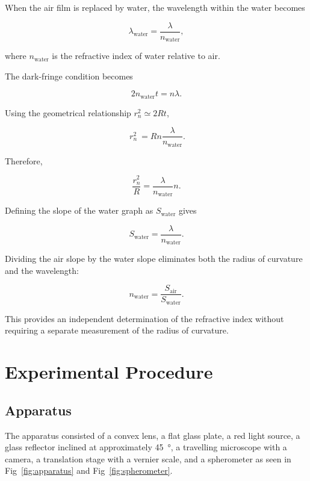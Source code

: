 \documentclass[12pt,a4paper]{article}
\begin{document}
When the air film is replaced by water, the
wavelength within the water becomes

\[
\lambda_{\mathrm{water}}
=\frac{\lambda}{n_{\mathrm{water}}},
\]

where $n_{\mathrm{water}}$ is the refractive index
of water relative to air.

The dark-fringe condition becomes

\[
2n_{\mathrm{water}}t=n\lambda.
\]

Using the geometrical relationship
$r_n^2\simeq 2Rt$,

\[
\ r_n^2
\ =Rn\frac{\lambda}{n_{\mathrm{water}}}.
\]

Therefore,

\begin{equation}
\boxed{
\frac{r_n^2}{R}
=\frac{\lambda}{n_{\mathrm{water}}}n
}.
\label{eq:water_slope}
\end{equation}

Defining the slope of the water graph as
$S_{\mathrm{water}}$ gives

\[
S_{\mathrm{water}}
=\frac{\lambda}{n_{\mathrm{water}}}.
\]

Dividing the air slope by the water slope
eliminates both the radius of curvature and
the wavelength:

\begin{equation}
\boxed{
n_{\mathrm{water}}  
=\frac{S_{\mathrm{air}}}{S_{\mathrm{water}}}
}.
\label{eq:ref_index}
\end{equation}

This provides an independent determination
of the refractive index without requiring
a separate measurement of the radius of
curvature.

\newpage

\section{Experimental Procedure}

\subsection{Apparatus}

The apparatus consisted of a convex lens, a
flat glass plate, a red light source, a glass
reflector inclined at approximately
\SI{45}{\degree}, a travelling microscope
with a camera, a translation stage with a
vernier scale, and a spherometer as seen in Fig~\ref{fig:apparatus} and Fig~\ref{fig:spherometer}.
\end{document}
